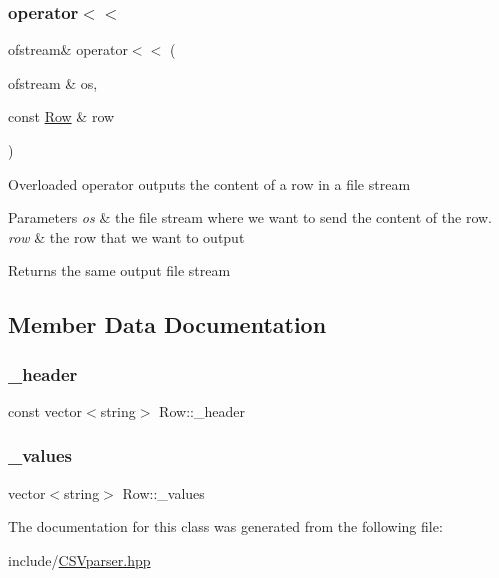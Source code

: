 \subsubsection{\texorpdfstring{operator$<$$<$}{operator<<}\hspace{0.1cm}{\footnotesize\ttfamily [2/2]}}
{\footnotesize\ttfamily ofstream\& operator$<$$<$ (\begin{DoxyParamCaption}\item[{ofstream \&}]{os,  }\item[{const \hyperlink{class_row}{Row} \&}]{row }\end{DoxyParamCaption})\hspace{0.3cm}{\ttfamily [friend]}}

Overloaded operator outputs the content of a row in a file stream 
\begin{DoxyParams}{Parameters}
{\em os} & the file stream where we want to send the content of the row. \\
\hline
{\em row} & the row that we want to output \\
\hline
\end{DoxyParams}
\begin{DoxyReturn}{Returns}
the same output file stream 
\end{DoxyReturn}


\subsection{Member Data Documentation}
\mbox{\label{class_row_a98603a15923aa97e15198393ef3080c0}} 
\subsubsection{\texorpdfstring{\+\_\+header}{\_header}}
{\footnotesize\ttfamily const vector$<$string$>$ Row\+::\+\_\+header\hspace{0.3cm}{\ttfamily [private]}}

\mbox{\label{class_row_ab064db33f941055c8d99a6f47eae733c}} 
\subsubsection{\texorpdfstring{\+\_\+values}{\_values}}
{\footnotesize\ttfamily vector$<$string$>$ Row\+::\+\_\+values\hspace{0.3cm}{\ttfamily [private]}}



The documentation for this class was generated from the following file\+:\begin{DoxyCompactItemize}
\item 
include/\hyperlink{_c_s_vparser_8hpp}{C\+S\+Vparser.\+hpp}\end{DoxyCompactItemize}
